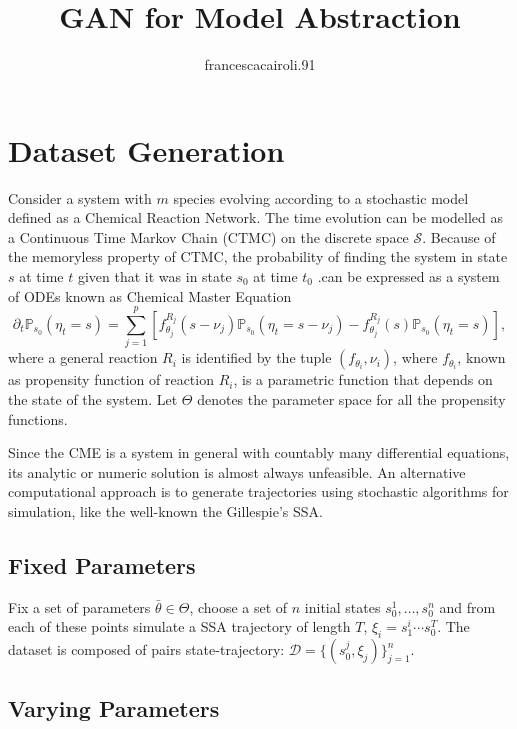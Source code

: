 \documentclass{article}
\title{GAN for Model Abstraction}
\author{francescacairoli.91 }
\date{}
\begin{document}
\maketitle

\section{Dataset Generation}

Consider a system with $m$ species evolving according to a stochastic model defined as a Chemical Reaction Network. The time evolution can be modelled as a Continuous Time Markov
Chain (CTMC) on the discrete space $\mathcal{S}$. Because of the memoryless property of CTMC, 
the probability of finding the
system in state $s$ at time $t$ given that it was in state $s_0$ at time $t_0$ .can be expressed as a system of ODEs known as Chemical Master Equation
\begin{equation}
    \partial_t\mathbb{P}_{s_0}(\eta_t=s) = \sum_{j=1}^p\left[ 
    f_{\theta_j}^{R_j}(s-\nu_j)\mathbb{P}_{s_0}(\eta_t=s-\nu_j)-f_{\theta_j}^{R_j}(s)\mathbb{P}_{s_0}(\eta_t =s)
    \right],
\end{equation}
where a general reaction $R_i$ is identified by the tuple $(f_{\theta_i},\nu_i)$, where $f_{\theta_i}$, known as propensity function of reaction $R_i$, is a parametric function that depends on the state of the system. Let $\Theta$ denotes the parameter space for all the propensity functions.

Since the CME is a system in general with countably many differential equations, its analytic or numeric solution is almost always unfeasible. An alternative
computational approach is to generate trajectories using stochastic algorithms
for simulation, like the well-known the Gillespie’s SSA.

\subsection{Fixed Parameters}

Fix a set of parameters $\bar{\theta}\in\Theta$, choose a set of $n$ initial states $s_0^1,\dots , s_0^n$ and from each of these points simulate a SSA trajectory of length $T$, $\xi_i = s_1^i\cdots s_0^T$. The dataset is composed of pairs state-trajectory: $\mathcal{D}= \{(s_0^j,\xi_j)\}_{j=1}^n$.

\subsection{Varying Parameters}
\end{document}
